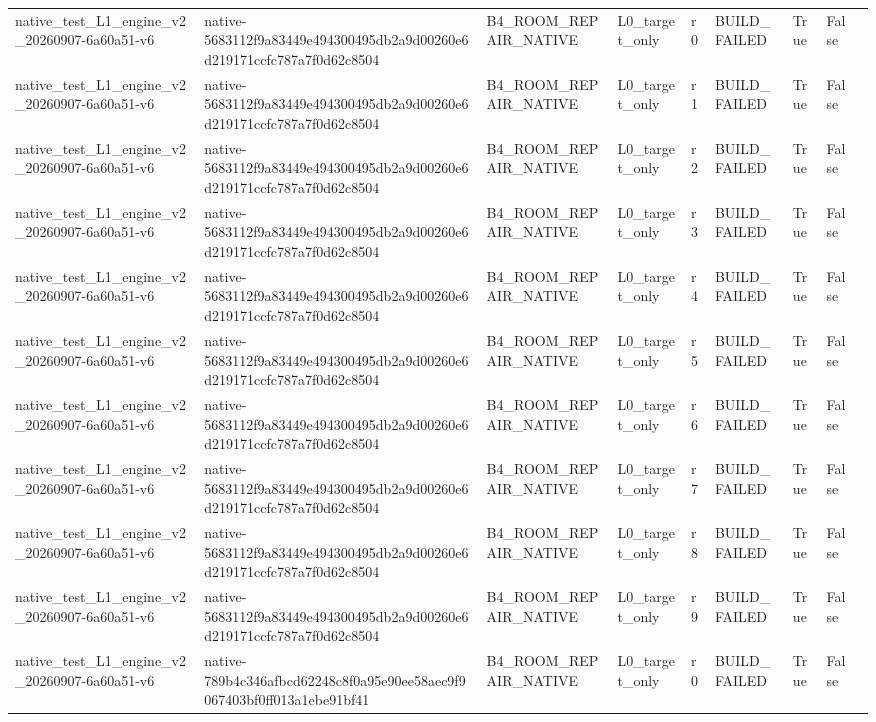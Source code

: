 \begin{tabular}{lllllllll}
native\_test\_L1\_engine\_v2\_20260907-6a60a51-v6 & native-5683112f9a83449e494300495db2a9d00260e6d219171ccfc787a7f0d62c8504 & B4\_ROOM\_REPAIR\_NATIVE & L0\_target\_only & r0 & BUILD\_FAILED & True & False &  \\
native\_test\_L1\_engine\_v2\_20260907-6a60a51-v6 & native-5683112f9a83449e494300495db2a9d00260e6d219171ccfc787a7f0d62c8504 & B4\_ROOM\_REPAIR\_NATIVE & L0\_target\_only & r1 & BUILD\_FAILED & True & False &  \\
native\_test\_L1\_engine\_v2\_20260907-6a60a51-v6 & native-5683112f9a83449e494300495db2a9d00260e6d219171ccfc787a7f0d62c8504 & B4\_ROOM\_REPAIR\_NATIVE & L0\_target\_only & r2 & BUILD\_FAILED & True & False &  \\
native\_test\_L1\_engine\_v2\_20260907-6a60a51-v6 & native-5683112f9a83449e494300495db2a9d00260e6d219171ccfc787a7f0d62c8504 & B4\_ROOM\_REPAIR\_NATIVE & L0\_target\_only & r3 & BUILD\_FAILED & True & False &  \\
native\_test\_L1\_engine\_v2\_20260907-6a60a51-v6 & native-5683112f9a83449e494300495db2a9d00260e6d219171ccfc787a7f0d62c8504 & B4\_ROOM\_REPAIR\_NATIVE & L0\_target\_only & r4 & BUILD\_FAILED & True & False &  \\
native\_test\_L1\_engine\_v2\_20260907-6a60a51-v6 & native-5683112f9a83449e494300495db2a9d00260e6d219171ccfc787a7f0d62c8504 & B4\_ROOM\_REPAIR\_NATIVE & L0\_target\_only & r5 & BUILD\_FAILED & True & False &  \\
native\_test\_L1\_engine\_v2\_20260907-6a60a51-v6 & native-5683112f9a83449e494300495db2a9d00260e6d219171ccfc787a7f0d62c8504 & B4\_ROOM\_REPAIR\_NATIVE & L0\_target\_only & r6 & BUILD\_FAILED & True & False &  \\
native\_test\_L1\_engine\_v2\_20260907-6a60a51-v6 & native-5683112f9a83449e494300495db2a9d00260e6d219171ccfc787a7f0d62c8504 & B4\_ROOM\_REPAIR\_NATIVE & L0\_target\_only & r7 & BUILD\_FAILED & True & False &  \\
native\_test\_L1\_engine\_v2\_20260907-6a60a51-v6 & native-5683112f9a83449e494300495db2a9d00260e6d219171ccfc787a7f0d62c8504 & B4\_ROOM\_REPAIR\_NATIVE & L0\_target\_only & r8 & BUILD\_FAILED & True & False &  \\
native\_test\_L1\_engine\_v2\_20260907-6a60a51-v6 & native-5683112f9a83449e494300495db2a9d00260e6d219171ccfc787a7f0d62c8504 & B4\_ROOM\_REPAIR\_NATIVE & L0\_target\_only & r9 & BUILD\_FAILED & True & False &  \\
native\_test\_L1\_engine\_v2\_20260907-6a60a51-v6 & native-789b4c346afbcd62248c8f0a95e90ee58aec9f9067403bf0ff013a1ebe91bf41 & B4\_ROOM\_REPAIR\_NATIVE & L0\_target\_only & r0 & BUILD\_FAILED & True & False &  \\

\end{tabular}
